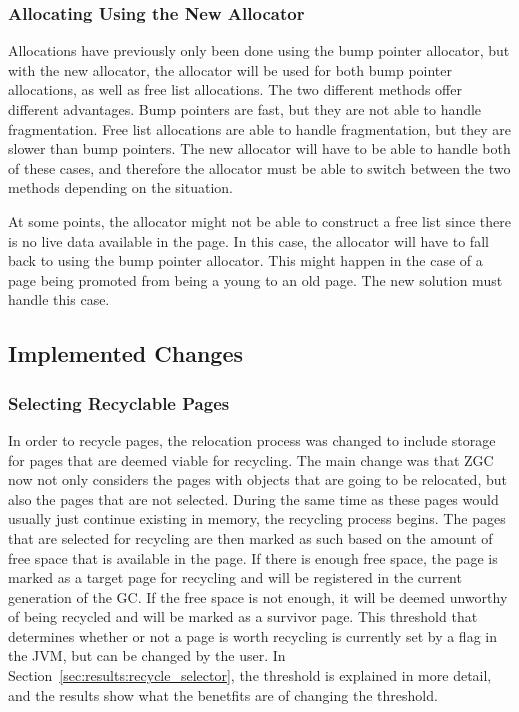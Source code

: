 \subsubsection{Allocating Using the New Allocator}
Allocations have previously only been done using the bump pointer allocator, but with the new allocator, the allocator will be used for both bump pointer allocations, as well as free list allocations. The two different methods offer different advantages. Bump pointers are fast, but they are not able to handle fragmentation. Free list allocations are able to handle fragmentation, but they are slower than bump pointers. The new allocator will have to be able to handle both of these cases, and therefore the allocator must be able to switch between the two methods depending on the situation. 

At some points, the allocator might not be able to construct a free list since there is no live data available in the page. In this case, the allocator will have to fall back to using the bump pointer allocator. This might happen in the case of a page being promoted from being a young to an old page. The new solution must handle this case.

\subsection{Implemented Changes}
\subsubsection{Selecting Recyclable Pages}
In order to recycle pages, the relocation process was changed to include storage for pages that are deemed viable for recycling. The main change was that ZGC now not only considers the pages with objects that are going to be relocated, but also the pages that are not selected. During the same time as these pages would usually just continue existing in memory, the recycling process begins. The pages that are selected for recycling are then marked as such based on the amount of free space that is available in the page. If there is enough free space, the page is marked as a target page for recycling and will be registered in the current generation of the GC. If the free space is not enough, it will be deemed unworthy of being recycled and will be marked as a survivor page. This threshold that determines whether or not a page is worth recycling is currently set by a flag in the JVM, but can be changed by the user. In Section~\ref{sec:results:recycle_selector}, the threshold is explained in more detail, and the results show what the benetfits are of changing the threshold.

